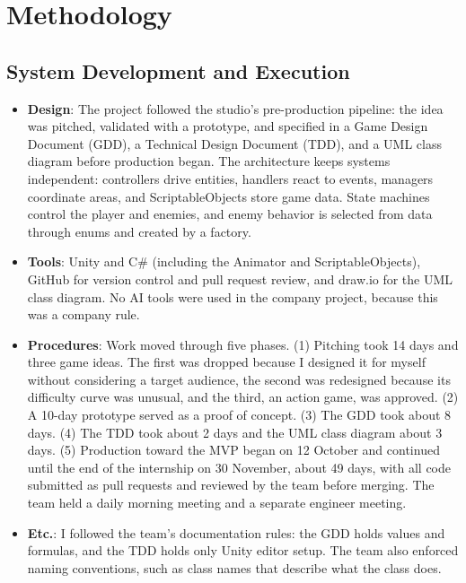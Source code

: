 \chapter{Methodology}

\section{System Development and Execution}

\begin{itemize}[label=-]
    \item \textbf{Design}: The project followed the studio's pre-production pipeline: the idea was pitched, validated with a prototype, and specified in a Game Design Document (GDD), a Technical Design Document (TDD), and a UML class diagram before production began. The architecture keeps systems independent: controllers drive entities, handlers react to events, managers coordinate areas, and ScriptableObjects store game data. State machines control the player and enemies, and enemy behavior is selected from data through enums and created by a factory.
    \item \textbf{Tools}: Unity and C\# (including the Animator and ScriptableObjects), GitHub for version control and pull request review, and draw.io for the UML class diagram. No AI tools were used in the company project, because this was a company rule.
    \item \textbf{Procedures}: Work moved through five phases. (1) Pitching took 14 days and three game ideas. The first was dropped because I designed it for myself without considering a target audience, the second was redesigned because its difficulty curve was unusual, and the third, an action game, was approved. (2) A 10-day prototype served as a proof of concept. (3) The GDD took about 8 days. (4) The TDD took about 2 days and the UML class diagram about 3 days. (5) Production toward the MVP began on 12 October and continued until the end of the internship on 30 November, about 49 days, with all code submitted as pull requests and reviewed by the team before merging. The team held a daily morning meeting and a separate engineer meeting.
    \item \textbf{Etc.}: I followed the team's documentation rules: the GDD holds values and formulas, and the TDD holds only Unity editor setup. The team also enforced naming conventions, such as class names that describe what the class does.
\end{itemize}


